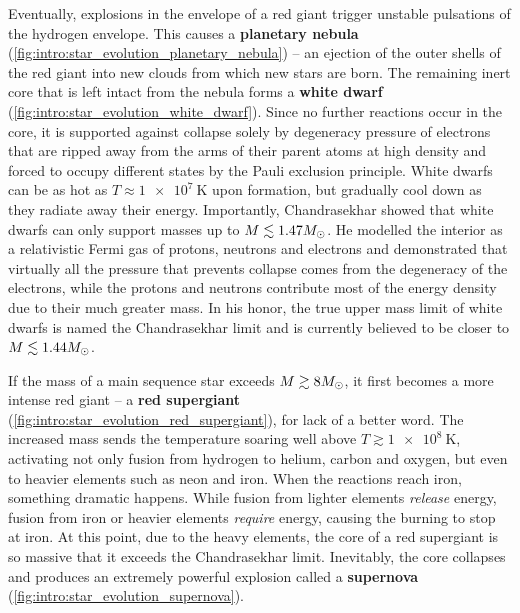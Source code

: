 Eventually, explosions in the envelope of a red giant trigger unstable pulsations of the hydrogen envelope.
This causes a \textbf{planetary nebula} (\cref{fig:intro:star_evolution_planetary_nebula}) -- an ejection of the outer shells of the red giant into new clouds from which new stars are born.
The remaining inert core that is left intact from the nebula forms a \textbf{white dwarf} (\cref{fig:intro:star_evolution_white_dwarf}).
Since no further reactions occur in the core, it is supported against collapse solely by degeneracy pressure of electrons that are ripped away from the arms of their parent atoms at high density and forced to occupy different states by the Pauli exclusion principle.
White dwarfs can be as hot as $T \approx \SI{1e7}{\kelvin}$ upon formation, but gradually cool down as they radiate away their energy.
Importantly, Chandrasekhar showed that white dwarfs can only support masses up to $M \lesssim 1.47 M_\odot$. \cite{ref:chandrasekhar_limit_nonideal}
He modelled the interior as a relativistic Fermi gas of protons, neutrons and electrons and demonstrated that virtually all the pressure that prevents collapse comes from the degeneracy of the electrons, while the protons and neutrons contribute most of the energy density due to their much greater mass.
In his honor, the true upper mass limit of white dwarfs is named the Chandrasekhar limit and is currently believed to be closer to $M \lesssim 1.44 M_\odot$. \cite{ref:glendenning}

If the mass of a main sequence star exceeds $M \gtrsim 8 M_\odot$, it first becomes a more intense red giant -- a \textbf{red supergiant} (\cref{fig:intro:star_evolution_red_supergiant}), for lack of a better word.
The increased mass sends the temperature soaring well above $T \gtrsim \SI{1e8}{\kelvin}$, activating not only fusion from hydrogen to helium, carbon and oxygen, but even to heavier elements such as neon and iron.
When the reactions reach iron, something dramatic happens.
While fusion from lighter elements \emph{release} energy, fusion from iron or heavier elements \emph{require} energy, causing the burning to stop at iron.
At this point, due to the heavy elements, the core of a red supergiant is so massive that it exceeds the Chandrasekhar limit.
Inevitably, the core collapses and produces an extremely powerful explosion called a \textbf{supernova} (\cref{fig:intro:star_evolution_supernova}).

